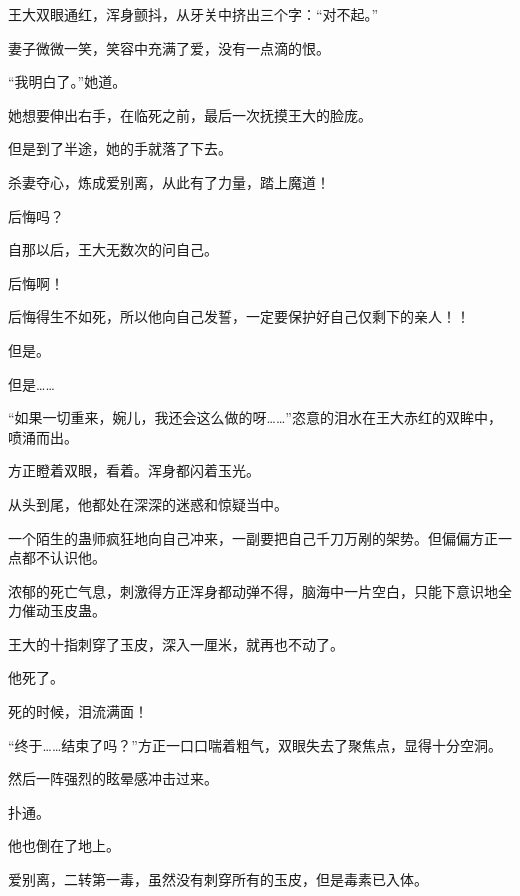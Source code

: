 \begin{this_body}
王大双眼通红，浑身颤抖，从牙关中挤出三个字：“对不起。”

妻子微微一笑，笑容中充满了爱，没有一点滴的恨。

“我明白了。”她道。

她想要伸出右手，在临死之前，最后一次抚摸王大的脸庞。

但是到了半途，她的手就落了下去。

杀妻夺心，炼成爱别离，从此有了力量，踏上魔道！

后悔吗？

自那以后，王大无数次的问自己。

后悔啊！

后悔得生不如死，所以他向自己发誓，一定要保护好自己仅剩下的亲人！！

但是。

但是……

“如果一切重来，婉儿，我还会这么做的呀……”恣意的泪水在王大赤红的双眸中，喷涌而出。

方正瞪着双眼，看着。浑身都闪着玉光。

从头到尾，他都处在深深的迷惑和惊疑当中。

一个陌生的蛊师疯狂地向自己冲来，一副要把自己千刀万剐的架势。但偏偏方正一点都不认识他。

浓郁的死亡气息，刺激得方正浑身都动弹不得，脑海中一片空白，只能下意识地全力催动玉皮蛊。

王大的十指刺穿了玉皮，深入一厘米，就再也不动了。

他死了。

死的时候，泪流满面！

“终于……结束了吗？”方正一口口喘着粗气，双眼失去了聚焦点，显得十分空洞。

然后一阵强烈的眩晕感冲击过来。

扑通。

他也倒在了地上。

爱别离，二转第一毒，虽然没有刺穿所有的玉皮，但是毒素已入体。

\end{this_body}

